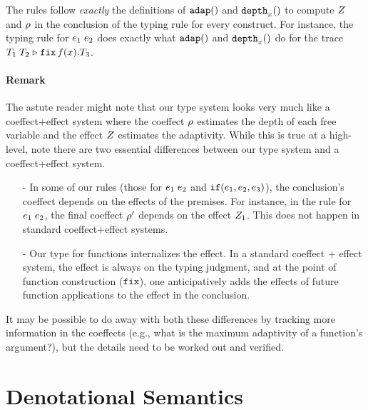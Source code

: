\documentclass[a4paper,11pt]{article}
\theoremstyle{definition}
\begin{document}
The rules follow \emph{exactly} the definitions of $\mathtt{adap}()$ and
$\mathtt{depth}_{x}()$ to compute $Z$ and $\rho$ in the conclusion of the
typing rule for every construct. For instance, the typing rule for
$e_1 \; e_2$ does exactly what $\mathtt{adap}()$ and $\mathtt{depth}_{x}()$
do for the trace $T_1 \; T_2 \mathrel{\triangleright} {\mathop{\mathtt{fix}} f(x).T_3}$.

\paragraph{Remark}
The astute reader might note that our type system looks very much like
a coeffect+effect system where the coeffect $\rho$ estimates the
depth of each free variable and the effect $Z$ estimates the
adaptivity. While this is true at a high-level, note there are two
essential differences between our type system and a coeffect+effect
system.
\begin{itemize}
\item[-] In some of our rules (those for $e_1 \; e_2$ and
  $\mathtt{if}(e_1, e_2, e_3)$), the conclusion's coeffect
  depends on the effects of the premises. For instance, in the rule
  for $e_1 \; e_2$, the final coeffect $\rho'$ depends on
  the effect $Z_1$. This does not happen in standard
  coeffect+effect systems.
\item[-] Our type for functions internalizes the effect. In a standard
  coeffect + effect system, the effect is always on the typing
  judgment, and at the point of function construction ($\mathop{\mathtt{fix}}$), one
  anticipatively adds the effects of future function applications to
  the effect in the conclusion.
\end{itemize}
It may be possible to do away with both these differences by tracking
more information in the coeffects (e.g., what is the maximum
adaptivity of a function's argument?), but the details need to be
worked out and verified.




\section{Denotational Semantics}
\end{document}
